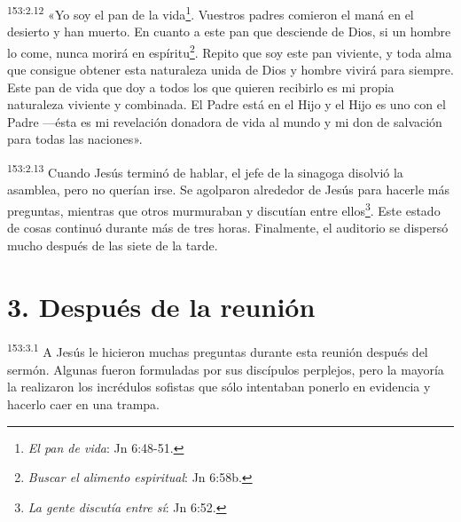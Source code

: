 \par 
\textsuperscript{153:2.12} «Yo soy el pan de la vida\footnote{\textit{El pan de vida}: Jn 6:48-51.}. Vuestros padres comieron el maná en el desierto y han muerto. En cuanto a este pan que desciende de Dios, si un hombre lo come, nunca morirá en espíritu\footnote{\textit{Buscar el alimento espiritual}: Jn 6:58b.}. Repito que soy este pan viviente, y toda alma que consigue obtener esta naturaleza unida de Dios y hombre vivirá para siempre. Este pan de vida que doy a todos los que quieren recibirlo es mi propia naturaleza viviente y combinada. El Padre está en el Hijo y el Hijo es uno con el Padre ---ésta es mi revelación donadora de vida al mundo y mi don de salvación para todas las naciones».

\par 
\textsuperscript{153:2.13} Cuando Jesús terminó de hablar, el jefe de la sinagoga disolvió la asamblea, pero no querían irse. Se agolparon alrededor de Jesús para hacerle más preguntas, mientras que otros murmuraban y discutían entre ellos\footnote{\textit{La gente discutía entre sí}: Jn 6:52.}. Este estado de cosas continuó durante más de tres horas. Finalmente, el auditorio se dispersó mucho después de las siete de la tarde.

\section*{3. Después de la reunión}
\par 
\textsuperscript{153:3.1} A Jesús le hicieron muchas preguntas durante esta reunión después del sermón. Algunas fueron formuladas por sus discípulos perplejos, pero la mayoría la realizaron los incrédulos sofistas que sólo intentaban ponerlo en evidencia y hacerlo caer en una trampa.

